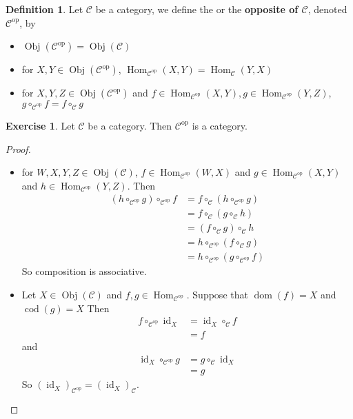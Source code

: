 \documentclass[12pt]{amsart}
\theoremstyle{definition}
\newtheorem{defn}[definition]{Definition}
\newtheorem{ex}[definition]{Exercise}
\newcommand{\MC}{\mathcal{C}}
\newcommand{\op}[1]{\mathcal{#1}^{\text{op}}}
\DeclareMathOperator{\id}{id}
\DeclareMathOperator{\dom}{dom}
\DeclareMathOperator{\cod}{cod}
\DeclareMathOperator{\Obj}{Obj}
\DeclareMathOperator{\Hom}{Hom}
\DeclareMathOperator*{\0}{\mbf{0}}
\DeclareMathOperator*{\1}{\mbf{1}}
\newcommand{\lex}[1]{\label{ex:#1}}
\newcommand{\ld}[1]{\label{defn:#1}}
\begin{document}
	\begin{defn}  \ld{12004}
		Let $\MC$ be a category, we define the \text{dual of $\MC$} or the \textbf{opposite of $\MC$}, denoted $\op{C}$, by 
		\begin{itemize}
			\item $\Obj(\op{C}) = \Obj(\MC)$
			\item for $X,Y \in \Obj(\op{C})$, $\Hom_{\op{C}}(X,Y) = \Hom_{\MC}(Y,X)$
			\item for $X, Y, Z \in \Obj(\op{C})$ and $f \in \Hom_{\op{C}}(X, Y), g \in \Hom_{\op{C}}(Y,Z)$, $g \circ_{\op{C}} f = f \circ_{\MC} g$
		\end{itemize}
	\end{defn}

	\begin{ex}  \lex{12005}
		Let $\MC$ be a category. Then $\op{C}$ is a category.
	\end{ex}
	
	\begin{proof}\
		\begin{itemize}
			\item for $W,X,Y,Z \in \Obj(\MC)$, $f \in \Hom_{\op{C}}(W, X)$ and $g \in \Hom_{\op{C}}(X, Y)$ and $h \in \Hom_{\op{C}}(Y, Z)$. Then 
			\begin{align*}
				(h \circ_{\op{C}} g) \circ_{\op{C}} f 
				&= f \circ_{\MC}( h \circ_{\op{C}} g) \\
				&= f \circ_{\MC} (g \circ_{\MC} h) \\
				&= (f \circ_{\MC} g) \circ_{\MC} h \\
				&= h \circ_{\op{C}} (f \circ_{\MC} g) \\
				&= h \circ_{\op{C}} (g \circ_{\op{C}} f)
			\end{align*}
			So composition is associative.
			\item Let $X \in \Obj(\MC)$ and $f,g \in \Hom_{\op{C}}$. Suppose that $\dom(f) = X$ and $\cod(g) = X$ 
			Then 
			\begin{align*}
				f  \circ_{\op{C}} \id_X
				&= \id_X  \circ_{\MC} f \\
				&= f
			\end{align*}
			and 
			\begin{align*}
				\id_X  \circ_{\op{C}} g 
				&= g \circ_{\MC} \id_X \\
				&= g
			\end{align*}
		So $(\id_X)_{\op{C}} =  (\id_X)_{\MC}$.
		\end{itemize}
	\end{proof}
\end{document}
